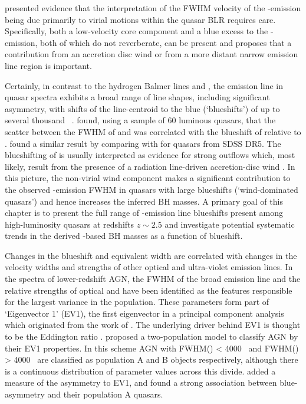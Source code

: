 \citet{denney12} presented evidence that the interpretation of the FWHM velocity of the -emission being due primarily to virial motions within the quasar BLR requires care.  
Specifically, both a low-velocity core component and a blue excess to the -emission, both of which do not reverberate, can be present and \citet{denney12} proposes that a contribution from an accretion disc wind or from a more distant narrow emission line region is important.

Certainly, in contrast to the hydrogen Balmer lines and , the  emission line in quasar spectra exhibits a broad range of line shapes, including significant asymmetry, with shifts of the line-centroid to the blue (`blueshifts') of up to several thousand \kms\, \citep{richards02,baskin05,sulentic06}.  
\citet{shen12} found, using a sample of 60 luminous quasars, that the scatter between the FWHM of  and \hb was correlated with the blueshift of  relative to \hbns. 
\citet{shen08} found a similar result by comparing  with  for quasars from SDSS DR5.  
The blueshifting of  is usually interpreted as evidence for strong outflows \citep[e.g.][]{sulentic07, richards11} which, most likely, result from the presence of a radiation line-driven accretion-disc wind \citep[e.g.][]{konigl94, murray95, proga00, everett05, gallagher15}.  
In this picture, the non-virial wind component makes a significant contribution to the observed -emission FWHM in quasars with large  blueshifts (`wind-dominated quasars') and hence increases the inferred BH masses.
A primary goal of this chapter is to present the full range of -emission line blueshifts present among high-luminosity quasars at redshifts $z\sim2.5$ and investigate potential systematic trends in the derived -based BH masses as a function of blueshift.

Changes in the  blueshift and equivalent width are correlated with changes in the velocity widths and strengths of other optical and ultra-violet emission lines.
In the spectra of lower-redshift AGN, the FWHM of the broad \hb emission line and the relative strengths of optical  and \hb have been identified as the features responsible for the largest variance in the population. 
These parameters form part of `Eigenvector 1' (EV1), the first eigenvector in a principal component analysis which originated from the work of \citet{boroson92}.   
The underlying driver behind EV1 is thought to be the Eddington ratio \citep[e.g.][]{sulentic00b,shen14}. 
\citet{sulentic00b} proposed a two-population model to classify AGN by their EV1 properties. 
In this scheme AGN with FWHM(\hbns) < 4000 \kms\, and FWHM(\hbns) > 4000 \kms\, are classified as population A and B objects respectively, although there is a continuous distribution of parameter values across this divide. 
\citet{sulentic07} added a measure of the  asymmetry to EV1, and found a strong association between blue-asymmetry and their population A quasars.

